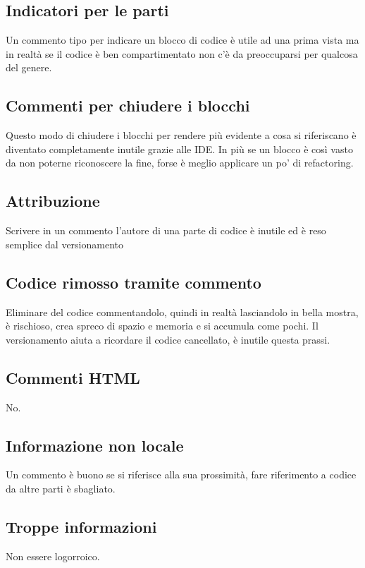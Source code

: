 \documentclass[11pt,a4paper]{book}
\begin{document}
\subsection{Indicatori per le parti}
Un commento tipo
\label{code: 034}
per indicare un blocco di codice è utile ad una prima vista ma in realtà se il codice è ben compartimentato non c'è da preoccuparsi per qualcosa del genere.

\subsection{Commenti per chiudere i blocchi}
\label{code: 035}
Questo modo di chiudere i blocchi per rendere più evidente a cosa si riferiscano è diventato completamente inutile grazie alle IDE. In più se un blocco è così vasto da non poterne riconoscere la fine, forse è meglio applicare un po' di refactoring.

\subsection{Attribuzione}
Scrivere in un commento l'autore di una parte di codice è inutile ed è reso semplice dal versionamento

\subsection{Codice rimosso tramite commento}
Eliminare del codice commentandolo, quindi in realtà lasciandolo in bella mostra, è rischioso, crea spreco di spazio e memoria e si accumula come pochi. Il versionamento aiuta a ricordare il codice cancellato, è inutile questa prassi.

\subsection{Commenti HTML}
\label{code: 036}
No.

\subsection{Informazione non locale}
Un commento è buono se si riferisce alla sua prossimità, fare riferimento a codice da altre parti è sbagliato.

\subsection{Troppe informazioni}
Non essere logorroico.
\end{document}
